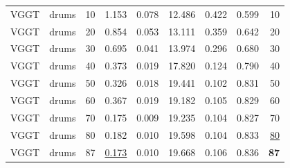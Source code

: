 \begin{table}[H]
\begin{tabular}{llrrrrrrr}
VGGT & drums & 10 & 1.153 & 0.078 & 12.486 & 0.422 & 0.599 & 10 \\
VGGT & drums & 20 & 0.854 & 0.053 & 13.111 & 0.359 & 0.642 & 20 \\
VGGT & drums & 30 & 0.695 & 0.041 & 13.974 & 0.296 & 0.680 & 30 \\
VGGT & drums & 40 & 0.373 & 0.019 & 17.820 & 0.124 & 0.790 & 40 \\
VGGT & drums & 50 & 0.326 & 0.018 & 19.441 & 0.102 & 0.831 & 50 \\
VGGT & drums & 60 & 0.367 & 0.019 & 19.182 & 0.105 & 0.829 & 60 \\
VGGT & drums & 70 & 0.175 & 0.009 & 19.235 & 0.104 & 0.827 & 70 \\
VGGT & drums & 80 & 0.182 & 0.010 & 19.598 & 0.104 & 0.833 & \underline{80} \\
VGGT & drums & 87 & \underline{0.173} & 0.010 & 19.668 & 0.106 & 0.836 & \textbf{87} \\
\bottomrule
\end{tabular}
\end{table}